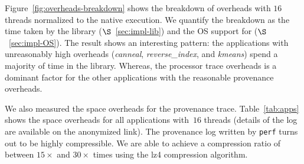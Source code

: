  Figure~\ref{fig:overheads-breakdown} shows the breakdown of overheads with $16$ threads normalized to the native \pthreads execution. We quantify the breakdown as the time taken by the \projecttitle library ($\S$~\ref{sec:impl-lib}) and the OS support for \intelpt  ($\S$~\ref{sec:impl-OS}). The result shows an interesting pattern: the applications with unreasonably high overheads ({\em canneal}, {\em reverse\_index}, and {\em kmeans}) spend a majority of time in the \projecttitle library. Whereas, the processor trace overheads is a dominant factor for the other applications with the reasonable provenance overheads.





 We also measured the space overheads for the provenance trace. Table~\ref{tab:apps} shows the space overheads for all applications with~$16$ threads (details of the log are available on the anonymized link). The provenance log written by {\tt perf} turns out to be highly compressible. We
are able to achieve a compression ratio of between $15\times$ and $30\times$ times using the lz4 compression algorithm.


